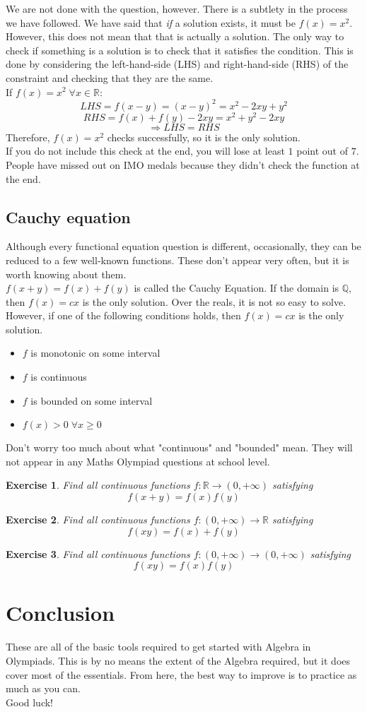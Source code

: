 \documentclass[a4paper,12pt]{article}
\newtheorem{exercise}{Exercise}
\begin{document}
We are not done with the question, however. There is a subtlety in the process we have followed. We have said that \emph{if} a solution exists, it must be $f(x) = x^2$. However, this does not mean that that is actually a solution.
The only way to check if something is a solution is to check that it satisfies the condition. This is done by considering the left-hand-side (LHS) and right-hand-side (RHS) of the constraint and checking that they are the same.\\

If $f(x) = x^2 \; \forall x \in \mathbb{R}$:
$$LHS = f(x - y) = (x - y)^2 = x^2 - 2xy + y^2$$
$$RHS = f(x) + f(y) - 2xy = x^2 + y^2 - 2xy$$
$$\Rightarrow LHS = RHS $$
Therefore, $f(x) = x^2$ checks successfully, so it is the only solution.\\
If you do not include this check at the end, you will lose at least $1$ point out of $7$. People have missed out on IMO medals because they didn't check the function at the end.\\

\subsection{Cauchy equation}
Although every functional equation question is different, occasionally, they can be reduced to a few well-known functions. These don't appear very often, but it is worth knowing about them.\\

$f(x + y) = f(x) + f(y)$ is called the Cauchy Equation. If the domain is $\mathbb{Q}$, then $f(x) = cx$ is the only solution. Over the reals, it is not so easy to solve. However, if one of the following conditions holds, then $f(x) = cx$ is the only solution.
\begin{itemize}
    \item $f$ is monotonic on some interval
    \item $f$ is continuous
    \item $f$ is bounded on some interval
    \item $f(x) > 0 \; \forall x \ge 0$
\end{itemize}

Don't worry too much about what "continuous" and "bounded" mean. They will not appear in any Maths Olympiad questions at school level.

\begin{exercise}
    Find all continuous functions $f: \mathbb{R} \rightarrow (0, +\infty)$ satisfying
    $$f(x + y) = f(x)f(y)$$
\end{exercise}
\begin{exercise}
    Find all continuous functions $f: (0, +\infty) \rightarrow \mathbb{R}$ satisfying
    $$f(xy) = f(x) + f(y)$$
\end{exercise}
\begin{exercise}
    Find all continuous functions $f: (0, +\infty) \rightarrow (0, +\infty)$ satisfying
    $$f(xy) = f(x)f(y)$$
\end{exercise}

\section{Conclusion}
These are all of the basic tools required to get started with Algebra in Olympiads. This is by no means the extent of the Algebra required, but it does cover most of the essentials. From here, the best way to improve is to practice as much as you can.\\ Good luck!
\end{document}
